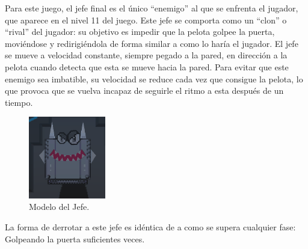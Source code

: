 Para este juego, el jefe final es el único ``enemigo'' al que se enfrenta el jugador, que aparece en el nivel 11 del juego. Este jefe se comporta como un ``clon'' o ``rival'' del jugador: su objetivo es impedir que la pelota golpee la puerta, moviéndose y redirigiéndola de forma similar a como lo haría el jugador. El jefe se mueve a velocidad constante, siempre pegado a la pared, en dirección a la pelota cuando detecta que esta se mueve hacia la pared. Para evitar que este enemigo sea imbatible, su velocidad se reduce cada vez que consigue la pelota, lo que provoca que se vuelva incapaz de seguirle el ritmo a esta después de un tiempo.

\begin{figure}[h]
	\includegraphics[width=0.30\textwidth]{images/estructura/jefe/boss-captura}
	\centering
	\caption{Modelo del Jefe.}
\end{figure}

La forma de derrotar a este jefe es idéntica de a como se supera cualquier fase: Golpeando la puerta suficientes veces.

